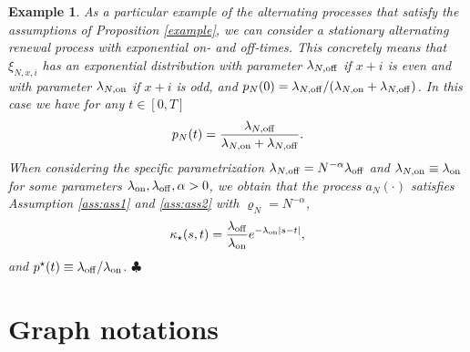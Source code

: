 \documentclass[11pt,reqno]{amsart}
\numberwithin{equation}{section}
\newcommand{\abs}[1]{\left\lvert #1 \right\rvert}
\newtheorem{example}[theo]{Example}
\newcommand{\neprop}[1]{{Proposition \ref{#1}}}
\begin{document}
\begin{example}\label{ex:process}\em 
    As a particular example of the alternating processes that satisfy the assumptions of \neprop{example}, we can consider a stationary alternating renewal process with exponential on- and off-times. This concretely means that $\xi_{N,x,i}$ has an exponential distribution with parameter $\lambda_{N, {\rm off}}$ if $x+i$ is even and with parameter $\lambda_{N, {\rm on}}$ if $x+i$ is odd, and $p_{N}(0) = \lambda_{N, {\rm off}} / (\lambda_{N, {\rm on}}+\lambda_{N, {\rm off}})$. In this case we have for any $t\in[0,T]$
    \begin{align*}
        p_N(t) = \frac{\lambda_{N, {\rm off}}}{\lambda_{N, {\rm on}}+\lambda_{N, {\rm off}}}.
    \end{align*}
    When considering the specific parametrization $\lambda_{N, {\rm off}}= N^{-\alpha}\lambda_{{\rm off}}$ and $\lambda_{N, {\rm on}}\equiv \lambda_{{\rm on}}$ for some parameters $\lambda_{\rm on},\lambda_{\rm off},\alpha>0$, we obtain that the process {$a_N(\cdot)$} satisfies Assumption \ref{ass:ass1} and \ref{ass:ass2} with $\varrho_N = N^{-\alpha}$,      \begin{align*}
        \kappa_{\star}(s,t) = \frac{\lambda_{\rm off}}{\lambda_{\rm on}}e^{-\lambda_{\rm on}\abs{s-t}},
    \end{align*}
    and $p^{\star}(t) \equiv \lambda_{\rm off}/\lambda_{\rm on}$. \hfill$\clubsuit$
\end{example}





\section{Graph notations}\label{section:graph_notations}
\end{document}
